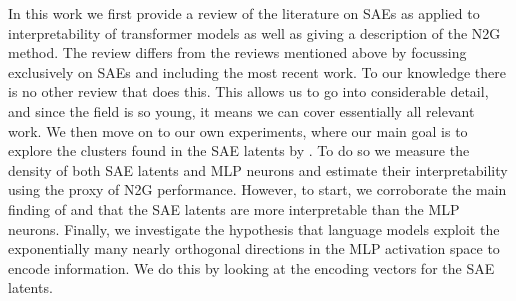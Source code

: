 In this work we first provide a review of the literature on \acp{SAE} as applied to interpretability of transformer models as well as giving a description of the \ac{N2G} method.
The review differs from the reviews mentioned above by focussing exclusively on \acp{SAE} and including the most recent work.
To our knowledge there is no other review that does this.
This allows us to go into considerable detail, and since the field is so young, it means we can cover essentially all relevant work.
We then move on to our own experiments, where our main goal is to explore the clusters found in the \ac{SAE} latents by \textcite{bricken_towards_2023}.
To do so we measure the density of both \ac{SAE} latents and \ac{MLP} neurons and estimate their interpretability using the proxy of \ac{N2G} performance.
However, to start, we corroborate the main finding of \textcite{bricken_towards_2023} and \textcite{cunningham_sparse_2023} that the \ac{SAE} latents are more interpretable than the \ac{MLP} neurons.
Finally, we investigate the hypothesis that language models exploit the exponentially many nearly orthogonal directions in the \ac{MLP} activation space to encode information.
We do this by looking at the encoding vectors for the \ac{SAE} latents.
